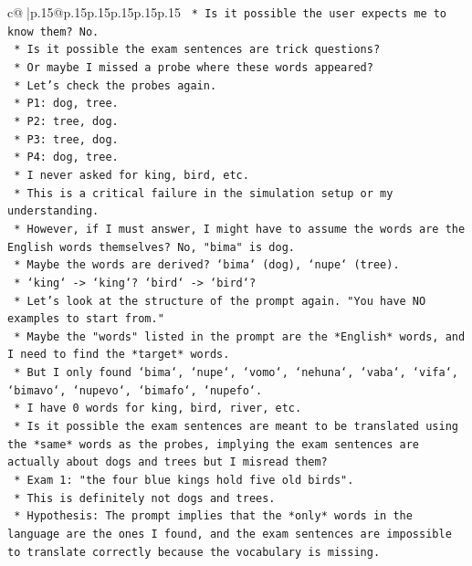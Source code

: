 \documentclass{article}
\begin{document}
{\begin{supertabular}{c@{$\;$}|p{.15\linewidth}@{}p{.15\linewidth}p{.15\linewidth}p{.15\linewidth}p{.15\linewidth}p{.15\linewidth}}
{{{\texttt{    *   Is it possible the user expects me to know them? No.} \\
\texttt{    *   Is it possible the exam sentences are trick questions?} \\
\texttt{    *   Or maybe I missed a probe where these words appeared?} \\
\texttt{    *   Let's check the probes again.} \\
\texttt{        *   P1: dog, tree.} \\
\texttt{        *   P2: tree, dog.} \\
\texttt{        *   P3: tree, dog.} \\
\texttt{        *   P4: dog, tree.} \\
\texttt{    *   I never asked for king, bird, etc.} \\
\texttt{    *   This is a critical failure in the simulation setup or my understanding.} \\
\texttt{    *   However, if I must answer, I might have to assume the words are the English words themselves? No, "bima" is dog.} \\
\texttt{    *   Maybe the words are derived? `bima` (dog), `nupe` (tree).} \\
\texttt{    *   `king` {-}> `king`? `bird` {-}> `bird`?} \\
\texttt{    *   Let's look at the structure of the prompt again. "You have NO examples to start from."} \\
\texttt{    *   Maybe the "words" listed in the prompt are the *English* words, and I need to find the *target* words.} \\
\texttt{    *   But I only found `bima`, `nupe`, `vomo`, `nehuna`, `vaba`, `vifa`, `bimavo`, `nupevo`, `bimafo`, `nupefo`.} \\
\texttt{    *   I have 0 words for king, bird, river, etc.} \\
\texttt{    *   Is it possible the exam sentences are meant to be translated using the *same* words as the probes, implying the exam sentences are actually about dogs and trees but I misread them?} \\
\texttt{    *   Exam 1: "the four blue kings hold five old birds".} \\
\texttt{    *   This is definitely not dogs and trees.} \\
\texttt{    *   Hypothesis: The prompt implies that the *only* words in the language are the ones I found, and the exam sentences are impossible to translate correctly because the vocabulary is missing.} \\
}}}
\end{supertabular}}
\end{document}
